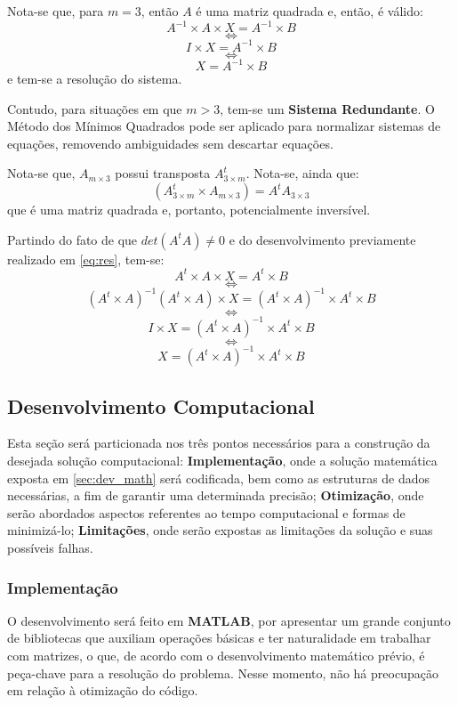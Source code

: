 	Nota-se que, para $m=3$, então $A$ é uma matriz quadrada e, então, é válido:
	\[A^{-1}\times A \times X = A^{-1}\times B\]
	$$\iff$$
	\[I \times X = A^{-1}\times B \]
	$$\iff$$
	\[X = A^{-1}\times B\]
	e tem-se a resolução do sistema.

	Contudo, para situações em que $m>3$, tem-se um \textbf{Sistema Redundante}.
	O Método dos Mínimos Quadrados pode ser aplicado
	para normalizar sistemas de equações, removendo ambiguidades sem descartar equações.

	Nota-se que, $A_{m\times3}$ possui transposta $A_{3\times m}^t$. Nota-se, ainda que:
	$$(A^t_{3\times m} \times A_{m\times3}) = A^tA_{3\times3}$$
	que é uma matriz quadrada e, portanto, potencialmente inversível.

	Partindo do fato de que $det(A^tA) \neq 0$ e do desenvolvimento previamente realizado em \ref{eq:res},
	tem-se:
	\[A^t \times A \times X = A^t \times B\]
	$$\iff$$
	\[(A^t\times A)^{-1}(A^t \times A) \times X = (A^t\times A)^{-1} \times A^t \times B\]
	$$\iff$$
	\[I \times X = (A^t\times A)^{-1} \times A^t \times B\]
	$$\iff$$
	\begin{equation}\label{eq:final}X = (A^t\times A)^{-1} \times A^t \times B\end{equation}

	\subsection{Desenvolvimento Computacional}
	\label{sec:dev_comp}
	Esta seção será particionada nos três pontos necessários para a construção da desejada solução
	computacional: \textbf{Implementação}, onde a solução matemática exposta em \ref{sec:dev_math}
	será codificada, bem como as estruturas de dados necessárias, a fim de garantir uma determinada
	precisão; \textbf{Otimização}, onde serão abordados aspectos referentes ao tempo computacional
	e formas de minimizá-lo; \textbf{Limitações}, onde serão expostas as limitações da solução e suas
	possíveis falhas.
	\subsubsection{Implementação}
	\label{sec:imple}
	O desenvolvimento será feito em \textbf{MATLAB}, por apresentar um grande conjunto de bibliotecas
	que auxiliam operações básicas e ter naturalidade em trabalhar com matrizes, o que, de acordo com o
	desenvolvimento matemático prévio, é peça-chave para a resolução do problema. Nesse momento,
	não há preocupação em relação à otimização do código.

